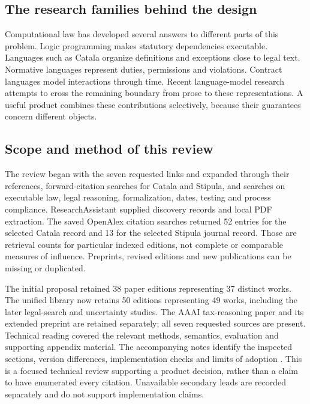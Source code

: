 \documentclass[12pt,a4paper,oneside,openany]{book}
\begin{document}
\subsection{The research families behind the design}
\label{merge:P-02-literature:00}

\label{sec:literature}

Computational law has developed several answers to different parts of this
problem. Logic programming makes statutory dependencies executable. Languages
such as Catala organize definitions and exceptions close to legal text. Normative
languages represent duties, permissions and violations. Contract languages model
interactions through time. Recent language-model research attempts to cross the
remaining boundary from prose to these representations. A useful product combines
these contributions selectively, because their guarantees concern different
objects.

\subsection{Scope and method of this review}
\label{merge:P-02-literature:01}


The review began with the seven requested links and expanded through their
references, forward-citation searches for Catala and Stipula, and searches on
executable law, legal reasoning, formalization, dates, testing and process
compliance. ResearchAssistant supplied discovery records and local PDF extraction.
The saved OpenAlex citation searches returned 52 entries for the selected Catala
record and 13 for the selected Stipula journal record. Those are retrieval counts
for particular indexed editions, not complete or comparable measures of influence.
Preprints, revised editions and new publications can be missing or duplicated.

The initial proposal retained 38 paper editions representing 37 distinct
works. The unified library now retains 50 editions representing 49 works,
including the later legal-search and uncertainty studies.
The AAAI tax-reasoning paper and its extended preprint are retained separately;
all seven requested sources are present. Technical reading covered the relevant
methods, semantics, evaluation and supporting appendix material. The accompanying
notes identify the inspected sections, version differences, implementation checks
and limits of adoption \citep{libraryreview}. This is a focused technical review
supporting a product decision, rather than a claim to have enumerated every
citation. Unavailable secondary leads are recorded separately and do not support
implementation claims.
\end{document}
